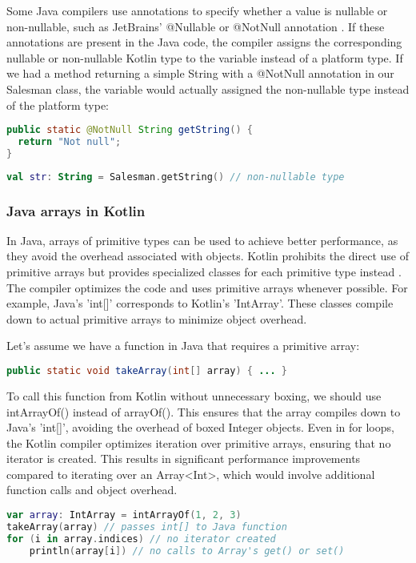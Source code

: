 \documentclass[a4paper,11pt]{article}
\begin{document}
Some Java compilers use annotations \cite{interop-nullability-annotations} to specify whether a value is nullable or non-nullable, such as JetBrains' @Nullable or @NotNull annotation \cite{JetBrains-annotations}. If these annotations are present in the Java code, the compiler assigns the corresponding nullable or non-nullable Kotlin type to the variable instead of a platform type. If we had a method returning a simple String with a @NotNull annotation in our Salesman class, the variable would actually assigned the non-nullable type instead of the platform type:
\begin{lstlisting}[language=Java]
public static @NotNull String getString() {
  return "Not null";
}
\end{lstlisting}
\begin{lstlisting}[language=Kotlin]
val str: String = Salesman.getString() // non-nullable type
\end{lstlisting}

\subsubsection{Java arrays in Kotlin}
In Java, arrays of primitive types can be used to achieve better performance, as they avoid the overhead associated with objects. Kotlin prohibits the direct use of primitive arrays but provides specialized classes for each primitive type instead \cite{interop-arrays}. The compiler optimizes the code and uses primitive arrays whenever possible. For example, Java's 'int[]' corresponds to Kotlin's 'IntArray'. These classes compile down to actual primitive arrays to minimize object overhead.

Let's assume we have a function in Java that requires a primitive array:
\begin{lstlisting}[language=Java]
public static void takeArray(int[] array) { ... }
\end{lstlisting}
To call this function from Kotlin without unnecessary boxing, we should use intArrayOf() instead of arrayOf(). This ensures that the array compiles down to Java's 'int[]', avoiding the overhead of boxed Integer objects. Even in for loops, the Kotlin compiler optimizes iteration over primitive arrays, ensuring that no iterator is created. This results in significant performance improvements compared to iterating over an Array<Int>, which would involve additional function calls and object overhead.
\begin{lstlisting}[language=Kotlin]
var array: IntArray = intArrayOf(1, 2, 3)
takeArray(array) // passes int[] to Java function
for (i in array.indices) // no iterator created
    println(array[i]) // no calls to Array's get() or set()
\end{lstlisting}
\end{document}
